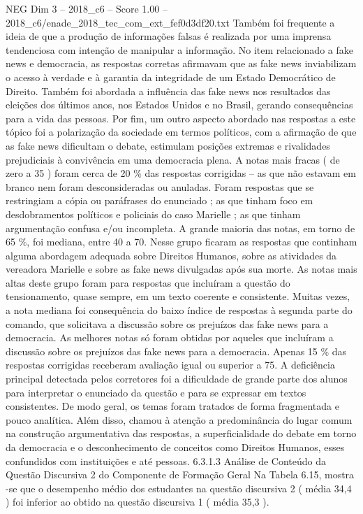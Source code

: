 \begin{textsample}{NEG Dim 3 – 2018\_c6 – Score 1.00 – 2018\_c6/enade\_2018\_tec\_com\_ext\_fef0d3df20.txt}
Também foi frequente a ideia de que a produção de informações falsas é realizada por uma imprensa tendenciosa com intenção de manipular a informação.
No item relacionado a fake news e democracia, as respostas corretas afirmavam que as fake news inviabilizam o acesso à verdade e à garantia da integridade de um Estado Democrático de Direito.
Também foi abordada a influência das fake news nos resultados das eleições dos últimos anos, nos Estados Unidos e no Brasil, gerando consequências para a vida das pessoas.
Por fim, um outro aspecto abordado nas respostas a este tópico foi a polarização da sociedade em termos políticos, com a afirmação de que as fake news dificultam o debate, estimulam posições extremas e rivalidades prejudiciais à convivência em uma democracia plena.
A notas mais fracas ( de zero a 35 ) foram cerca de 20 \% das respostas corrigidas – as que não estavam em branco nem foram desconsideradas ou anuladas.
Foram respostas que se restringiam a cópia ou paráfrases do enunciado ; as que tinham foco em desdobramentos políticos e policiais do caso Marielle ; as que tinham argumentação confusa e/ou incompleta.
A grande maioria das notas, em torno de 65 \%, foi mediana, entre 40 a 70.
Nesse grupo ficaram as respostas que continham alguma abordagem adequada sobre Direitos Humanos, sobre as atividades da vereadora Marielle e sobre as fake news divulgadas após sua morte.
As notas mais altas deste grupo foram para respostas que incluíram a questão do tensionamento, quase sempre, em um texto coerente e consistente.
Muitas vezes, a nota mediana foi consequência do baixo índice de respostas à segunda parte do comando, que solicitava a discussão sobre os prejuízos das fake news para a democracia.
As melhores notas só foram obtidas por aqueles que incluíram a discussão sobre os prejuízos das fake news para a democracia.
Apenas 15 \% das respostas corrigidas receberam avaliação igual ou superior a 75.
A deficiência principal detectada pelos corretores foi a dificuldade de grande parte dos alunos para interpretar o enunciado da questão e para se expressar em textos consistentes.
De modo geral, os temas foram tratados de forma fragmentada e pouco analítica.
Além disso, chamou à atenção a predominância do lugar comum na construção argumentativa das respostas, a superficialidade do debate em torno da democracia e o desconhecimento de conceitos como Direitos Humanos, esses confundidos com instituições e até pessoas. 6.3.1.3 Análise de Conteúdo da Questão Discursiva 2 do Componente de Formação Geral Na Tabela 6.15, mostra -se que o desempenho médio dos estudantes na questão discursiva 2 ( média 34,4 ) foi inferior ao obtido na questão discursiva 1 ( média 35,3 ).

\end{textsample}
